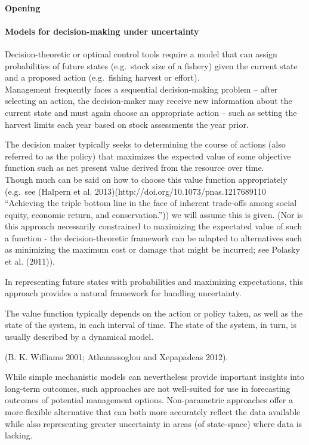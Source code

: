 \documentclass[author-year, review]{elsarticle} %
\begin{document}
\paragraph{Opening}\label{opening}

\paragraph{Models for decision-making under
uncertainty}\label{models-for-decision-making-under-uncertainty}

Decision-theoretic or optimal control tools require a model that can
assign probabilities of future states (e.g.~stock size of a fishery)
given the current state and a proposed action (e.g.~fishing harvest or
effort).\\Management frequently faces a sequential decision-making
problem -- after selecting an action, the decision-maker may receive new
information about the current state and must again choose an appropriate
action -- such as setting the harvest limits each year based on stock
assessments the year prior.

The decision maker typically seeks to determining the course of actions
(also referred to as the policy) that maximizes the expected value of
some objective function such as net present value derived from the
resource over time.\\Though much can be said on how to choose this value
function appropriately (e.g.~see (Halpern et al.
2013)(http://doi.org/10.1073/pnas.1217689110 ``Achieving the triple
bottom line in the face of inherent trade-offs among social equity,
economic return, and conservation.'')) we will assume this is given.
(Nor is this approach necessarily constrained to maximizing the
expectated value of such a function - the decision-theoretic framework
can be adapted to alternatives such as minimizing the maximum cost or
damage that might be incurred; see Polasky et al. (2011)).

In representing future states with probabilities and maximizing
expectations, this approach provides a natural framework for handling
uncertainty.

The value function typically depends on the action or policy taken, as
well as the state of the system, in each interval of time. The state of
the system, in turn, is usually described by a dynamical model.

(B. K. Williams 2001; Athanassoglou and Xepapadeas 2012).

While simple mechanistic models can nevertheless provide important
insights into long-term outcomes, such approaches are not well-suited
for use in forecasting outcomes of potential management options.
Non-parametric approaches offer a more flexible alternative that can
both more accurately reflect the data available while also representing
greater uncertainty in areas (of state-space) where data is lacking.
\end{document}
